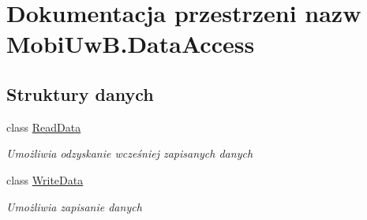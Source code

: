 \hypertarget{a00269}{}\section{Dokumentacja przestrzeni nazw Mobi\+Uw\+B.\+Data\+Access}
\label{a00269}
\subsection*{Struktury danych}
\begin{DoxyCompactItemize}
\item 
class \hyperlink{a00045}{Read\+Data}
\begin{DoxyCompactList}\small\item\em Umożliwia odzyskanie wcześniej zapisanych danych \end{DoxyCompactList}\item 
class \hyperlink{a00088}{Write\+Data}
\begin{DoxyCompactList}\small\item\em Umożliwia zapisanie danych \end{DoxyCompactList}\end{DoxyCompactItemize}
